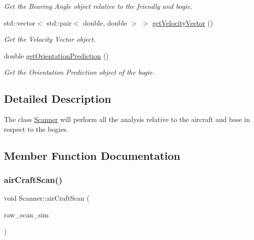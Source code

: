 \begin{DoxyCompactItemize}
\begin{DoxyCompactList}\small\item\em Get the Bearing Angle object relative to the friendly and bogie. \end{DoxyCompactList}\item 
std\+::vector$<$ std\+::pair$<$ double, double $>$ $>$ \hyperlink{classScanner_aa551cad3b1137f4fbe052181f09f987f}{get\+Velocity\+Vector} ()
\begin{DoxyCompactList}\small\item\em Get the Velocity Vector object. \end{DoxyCompactList}\item 
double \hyperlink{classScanner_a3ba854fbf61ce01180479f2d9fbf11f9}{get\+Orientation\+Prediction} ()
\begin{DoxyCompactList}\small\item\em Get the Orientation Prediction object of the bogie. \end{DoxyCompactList}\end{DoxyCompactItemize}


\subsection{Detailed Description}
The class \hyperlink{classScanner}{Scanner} will perform all the analysis relative to the aircraft and base in respect to the bogies. 

\subsection{Member Function Documentation}
\mbox{\label{classScanner_a61dd33aeecd220e4dec5f9cbd6403f9e}} 
\subsubsection{\texorpdfstring{air\+Craft\+Scan()}{airCraftScan()}}
{\footnotesize\ttfamily void Scanner\+::air\+Craft\+Scan (\begin{DoxyParamCaption}\item[{std\+::vector$<$ \hyperlink{structRangeBearingStamped}{Range\+Bearing\+Stamped} $>$ \&}]{raw\+\_\+scan\+\_\+sim }\end{DoxyParamCaption})}



